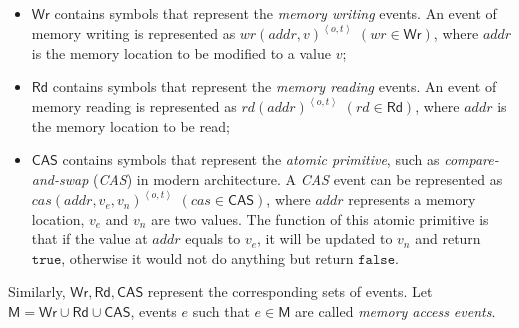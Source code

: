 \documentclass[runningheads]{llncs}
\newcommand{\ewrite}{\mathsf{Wr}}
\newcommand{\eread}{\mathsf{Rd}}
\newcommand{\ecas}{\mathsf{CAS}}
\begin{document}
\begin{itemize}
  \item $\ewrite$ contains symbols that represent the \textit{memory writing} events. An event of memory writing is represented as $wr(addr,v)^{\left\langle o,t\right\rangle}$ $(wr \in \ewrite)$, where $addr$ is the memory location to be modified to a value $v$;
  \item $\eread$ contains symbols that represent the \textit{memory reading} events. An event of memory reading is represented as $rd(addr)^{\left\langle o,t\right\rangle}$ $(rd \in \eread)$, where $addr$ is the memory location to be read;
  \item $\ecas$ contains symbols that represent the \textit{atomic primitive}, such as \textit{compare-and-swap} (\textit{CAS}) in modern architecture. A \textit{CAS} event can be represented as $cas(addr, v_e, v_n)^{\left\langle o,t\right\rangle}$ $(cas \in \ecas)$, where $addr$ represents a memory location, $v_e$ and $v_n$ are two values. The function of this atomic primitive is that if the value at $addr$ equals to $v_e$, it will be updated to $v_n$ and return $\mathtt{true}$, otherwise it would not do anything but return $\mathtt{false}$.
\end{itemize}
\noindent Similarly, $\ewrite, \eread, \ecas$ represent the corresponding sets of events. Let $\mathsf{M} = \ewrite\cup\eread\cup\ecas$, events $e$ such that $e\in \mathsf{M}$ are called \textit{memory access events}.
\end{document}
